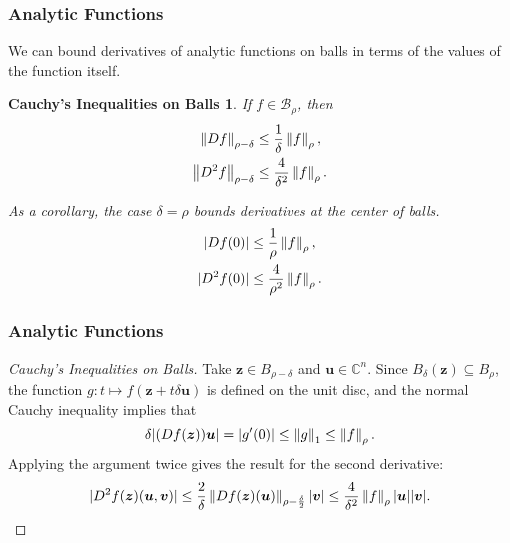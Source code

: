 \documentclass{beamer}
\newcommand{\C}{\mathbb{C}}
\newcommand{\bp}[1]{\bm{#1}}
\newcommand{\genericdel}[4]{%
  \ifcase#3\relax
  #1#4#2\or
  \bigl#1#4\bigr#2\or
  \Bigl#1#4\Bigr#2\or
  \biggl#1#4\biggr#2\or
  \Biggl#1#4\Biggr#2\else
  \left#1#4\right#2\fi
}
\newcommand{\enVert}[2][-1]{\genericdel\|\|{#1}{#2}}
\let\norm\enVert
\begin{document}
\begin{frame}
  \frametitle{Analytic Functions}
  We can bound derivatives of analytic functions on balls in terms of the values
  of the function itself.
  \newtheorem{cauchyball}{Cauchy's Inequalities on Balls}
  \begin{cauchyball}
    If $f \in \mathcal{B}_{\rho}$, then
    \begin{align*}
      \norm{Df}_{\rho - \delta} &\leq \frac{1}{\delta} \norm{f}_{\rho},\\
      \norm{D^2 f}_{\rho - \delta} &\leq \frac{4}{\delta^2} \norm{f}_{\rho}.
    \end{align*}

    As a corollary, the case $\delta = \rho$ bounds derivatives at the center of
    balls.
    \begin{align*}
      |Df(0)| &\leq \frac{1}{\rho} \norm{f}_{\rho},\\
      |D^2 f(0)| &\leq \frac{4}{\rho^2} \norm{f}_{\rho}.
    \end{align*}
  \end{cauchyball}
\end{frame}

\begin{frame}
  \frametitle{Analytic Functions}
  \begin{proof}[Cauchy's Inequalities on Balls]
    Take $\bp{z} \in B_{\rho - \delta}$ and $\bp{u} \in \C^n$.
    Since $B_{\delta}(\bp{z}) \subseteq B_{\rho}$, the function $g : t \mapsto
    f(\bp{z} + t \delta \bp{u})$ is defined on the unit disc, and the normal
    Cauchy inequality implies that
    \begin{equation*}
      \delta|(Df(\bp{z}))\bp{u}| = |g'(0)| \leq \norm{g}_1 \leq
      \norm{f}_{\rho}.
    \end{equation*}
    Applying the argument twice gives the result for the second derivative:
    \begin{equation*}
      |D^2 f(\bp{z})(\bp{u}, \bp{v})| \leq \frac{2}{\delta}
      \norm{Df(\bp{z})(\bp{u})}_{\rho - \frac{\delta}{2}}|\bp{v}| \leq
      \frac{4}{\delta^2} \norm{f}_{\rho} |\bp{u}||\bp{v}|.
    \end{equation*}
  \end{proof}
\end{frame}
\end{document}
